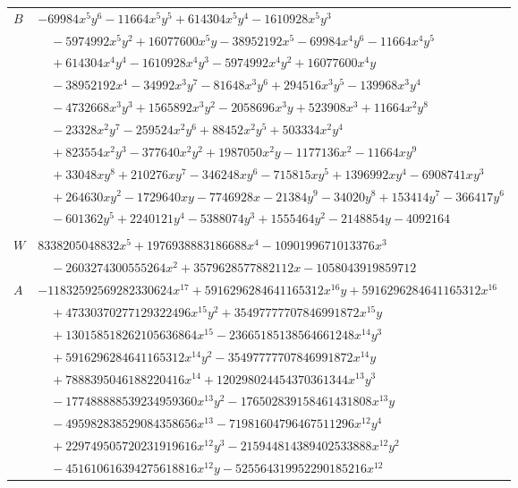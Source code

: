 \documentclass[11pt]{article}
\begin{document}
\begin{longtable}{@{}ll@{}}
$B$ & $-69984x^{5}y^{6}-11664x^{5}y^{5}+614304x^{5}y^{4}-1610928x^{5}y^{3}$\\
 & $\quad -5974992x^{5}y^{2}+16077600x^{5}y-38952192x^{5}-69984x^{4}y^{6}-11664x^{4}y^{5}$\\
 & $\quad +614304x^{4}y^{4}-1610928x^{4}y^{3}-5974992x^{4}y^{2}+16077600x^{4}y$\\
 & $\quad -38952192x^{4}-34992x^{3}y^{7}-81648x^{3}y^{6}+294516x^{3}y^{5}-139968x^{3}y^{4}$\\
 & $\quad -4732668x^{3}y^{3}+1565892x^{3}y^{2}-2058696x^{3}y+523908x^{3}+11664x^{2}y^{8}$\\
 & $\quad -23328x^{2}y^{7}-259524x^{2}y^{6}+88452x^{2}y^{5}+503334x^{2}y^{4}$\\
 & $\quad +823554x^{2}y^{3}-377640x^{2}y^{2}+1987050x^{2}y-1177136x^{2}-11664xy^{9}$\\
 & $\quad +33048xy^{8}+210276xy^{7}-346248xy^{6}-715815xy^{5}+1396992xy^{4}-6908741xy^{3}$\\
 & $\quad +264630xy^{2}-1729640xy-7746928x-21384y^{9}-34020y^{8}+153414y^{7}-366417y^{6}$\\
 & $\quad -601362y^{5}+2240121y^{4}-5388074y^{3}+1555464y^{2}-2148854y-4092164$\\
\addlinespace[3pt]
\multicolumn{2}{@{}l}{$i=64$, $m=3439853568$, neighbours $114,4,15,17,21,25,32,34,35,50,70,93,101$}\\
$W$ & $8338205048832x^{5}+1976938883186688x^{4}-1090199671013376x^{3}$\\
 & $\quad -2603274300555264x^{2}+3579628577882112x-1058043919859712$\\
$A$ & $-11832592569282330624x^{17}+5916296284641165312x^{16}y+5916296284641165312x^{16}$\\
 & $\quad +47330370277129322496x^{15}y^{2}+35497777707846991872x^{15}y$\\
 & $\quad +130158518262105636864x^{15}-23665185138564661248x^{14}y^{3}$\\
 & $\quad +5916296284641165312x^{14}y^{2}-35497777707846991872x^{14}y$\\
 & $\quad +7888395046188220416x^{14}+120298024454370361344x^{13}y^{3}$\\
 & $\quad -177488888539234959360x^{13}y^{2}-176502839158461431808x^{13}y$\\
 & $\quad -495982838529084358656x^{13}-71981604796467511296x^{12}y^{4}$\\
 & $\quad +229749505720231919616x^{12}y^{3}-215944814389402533888x^{12}y^{2}$\\
 & $\quad -451610616394275618816x^{12}y-525564319952290185216x^{12}$\\

\end{longtable}
\end{document}
